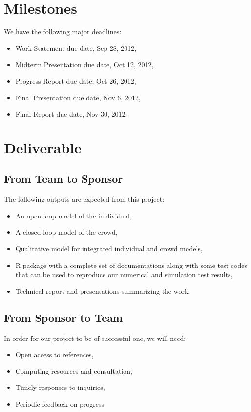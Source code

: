 \documentclass[12pt,letterpaper]{article}
\theoremstyle{definition}
\begin{document}
\section{Milestones}
We have the following major deadlines:
\begin{itemize}
    \item Work Statement due date, Sep 28, 2012,
    \item Midterm Presentation due date, Oct 12, 2012,
    \item Progress Report due date, Oct 26, 2012,
    \item Final Presentation due date, Nov 6, 2012,
    \item Final Report due date, Nov 30, 2012.
\end{itemize}

\section{Deliverable}
\subsection{From Team to Sponsor} %
The following outputs are expected from this project:
\begin{itemize}
    \item An open loop model of the inidividual,
    \item A closed loop model of the crowd,
    \item Qualitative model for integrated individual and crowd models,
    \item R package with a complete set of documentations along with some test 
        codes that can be used to reproduce our numerical and simulation test
        results,
    \item Technical report and presentations summarizing the work. 
\end{itemize}

\subsection{From Sponsor to Team} %

In order for our project to be of successful one, we will need:
\begin{itemize}
    \item Open access to references,
    \item Computing resources and consultation,
    \item Timely responses to inquiries,
    \item Periodic feedback on progress.
\end{itemize}


\newpage

\renewcommand\bibname{Selected Bibliography Including Cited Works}
\nocite{*}

\end{document}
